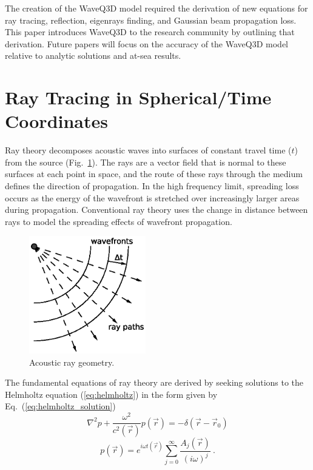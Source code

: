 \documentclass{ws-jca}
\begin{document}
The creation of the WaveQ3D model required the derivation of new equations for ray tracing, reflection, eigenrays finding, and Gaussian beam propagation loss. This paper introduces WaveQ3D to the research community by outlining that derivation.  Future papers will focus on the accuracy of the WaveQ3D model relative to analytic solutions and at-sea results.

\section{Ray Tracing in Spherical/Time Coordinates}

Ray theory decomposes acoustic waves into surfaces of constant travel time
(\(t\)) from the source (Fig.~\ref{fig:geometry}). The rays are a vector
field that is normal to these surfaces at each point in space, and the route of
these rays through the medium defines the direction of propagation. In the
high frequency limit, spreading loss occurs as the energy of the wavefront
is stretched over increasingly larger areas during propagation. Conventional ray
theory uses the change in distance between rays to model the spreading
effects of wavefront propagation.
\begin{figure}[th]
	\centerline{\includegraphics[width=2in]{AcousticRayGeometry.eps}} 
	\vspace*{8pt}
	\caption{Acoustic ray geometry.  \label{fig:geometry}}
\end{figure}
The fundamental equations of ray theory are derived\cite{Jensen1994} by
seeking solutions to the Helmholtz equation (\ref{eq:helmholtz}) in the
form given by Eq.~(\ref{eq:helmholtz_solution})
\begin{equation}
	\nabla^2p + \frac{\omega^2}{c^2(\vec{r})} p(\vec{r}) 
		= -\delta(\vec{r}-\vec{r}_0)
	\label{eq:helmholtz}
\end{equation}
\begin{equation}
	p(\vec{r}) = e^{i \omega t(\vec{r}) } 
		\sum_{j=0}^{\infty} \frac{ A_j(\vec{r}) }{(i\omega)^j} \:.
	\label{eq:helmholtz_solution}
\end{equation}
\end{document}
